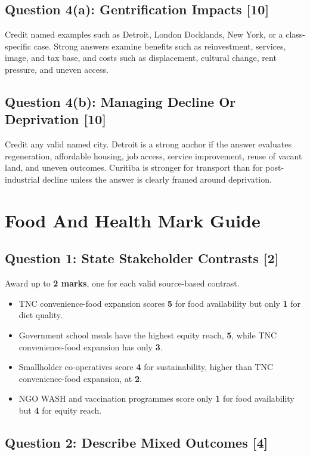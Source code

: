 \documentclass[11pt,a4paper]{article}
\newcommand{\term}[1]{\textcolor{HeadingBlue}{\textbf{#1}}}
\begin{document}
\subsection{Question 4(a): Gentrification Impacts [10]}

Credit named examples such as Detroit, London Docklands, New York, or a
class-specific case. Strong answers examine benefits such as reinvestment,
services, image, and tax base, and costs such as displacement, cultural change,
rent pressure, and uneven access.

\subsection{Question 4(b): Managing Decline Or Deprivation [10]}

Credit any valid named city. Detroit is a strong anchor if the answer evaluates
regeneration, affordable housing, job access, service improvement, reuse of
vacant land, and uneven outcomes. Curitiba is stronger for transport than for
post-industrial decline unless the answer is clearly framed around deprivation.

\section{Food And Health Mark Guide}

\subsection{Question 1: State Stakeholder Contrasts [2]}

Award up to \term{2 marks}, one for each valid source-based contrast.

\begin{itemize}
  \item TNC convenience-food expansion scores \term{5} for food availability
  but only \term{1} for diet quality.
  \item Government school meals have the highest equity reach, \term{5}, while
  TNC convenience-food expansion has only \term{3}.
  \item Smallholder co-operatives score \term{4} for sustainability, higher
  than TNC convenience-food expansion, at \term{2}.
  \item NGO WASH and vaccination programmes score only \term{1} for food
  availability but \term{4} for equity reach.
\end{itemize}

\subsection{Question 2: Describe Mixed Outcomes [4]}
\end{document}
